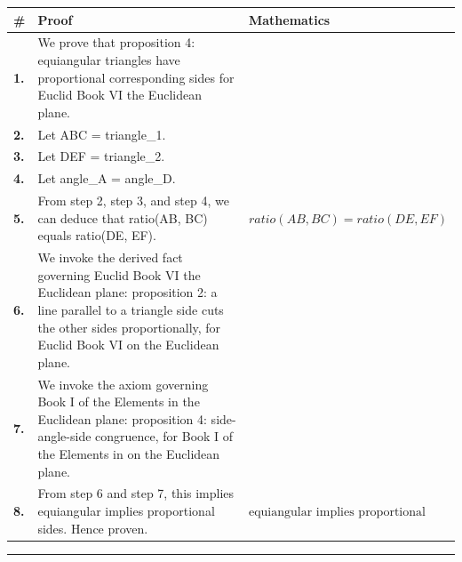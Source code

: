 \documentclass[11pt]{article}
\theoremstyle{definition}
\begin{document}
\begin{tabular}{@{} >{\raggedright\arraybackslash}p{} >{\raggedright\arraybackslash}p{} >{\raggedleft\arraybackslash}p{} @{}}
\textbf{\#} & \textbf{Proof} & \textbf{Mathematics} \\
\midrule
\textbf{1.} & We prove that proposition 4: equiangular triangles have proportional corresponding sides for Euclid Book VI the Euclidean plane. & \\[0.45em]
\textbf{2.} & Let ABC = triangle\_1. & \\[0.45em]
\textbf{3.} & Let DEF = triangle\_2. & \\[0.45em]
\textbf{4.} & Let angle\_A = angle\_D. & \\[0.45em]
\textbf{5.} & From step 2, step 3, and step 4, we can deduce that ratio(AB, BC) equals ratio(DE, EF). & $\displaystyle ratio(AB, BC) = ratio(DE, EF)$ \\[0.45em]
\textbf{6.} & We invoke the derived fact governing Euclid Book VI the Euclidean plane: proposition 2: a line parallel to a triangle side cuts the other sides proportionally, for Euclid Book VI on the Euclidean plane. & \\[0.45em]
\textbf{7.} & We invoke the axiom governing Book I of the Elements in the Euclidean plane: proposition 4: side-angle-side congruence, for Book I of the Elements in on the Euclidean plane. & \\[0.45em]
\textbf{8.} & From step 6 and step 7, this implies equiangular implies proportional sides. Hence proven. & $\displaystyle \text{equiangular implies proportional sides}$ \\[0.45em]
\bottomrule
\end{tabular}
\label{thm:Geometry-Euclid Book VI-proposition_4_equiangular_triangles_have_proportional_corresponding_sides}
\par\medskip\hrule
\end{document}
